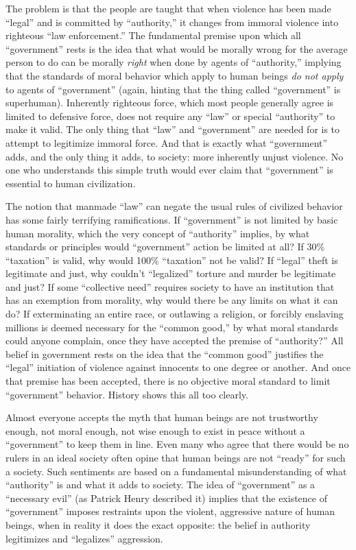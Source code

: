 \documentclass{book}
\begin{document}
The problem is that the people are taught that when violence has been made \enquote{legal} and is committed by \enquote{authority,} it changes from immoral violence into righteous \enquote{law enforcement.} The fundamental premise upon which all \enquote{government} rests is the idea that what would be morally wrong for the average person to do can be morally \emph{right} when done by agents of \enquote{authority,} implying that the standards of moral behavior which apply to human beings \emph{do not apply} to agents of \enquote{government} (again, hinting that the thing called \enquote{government} is superhuman). Inherently righteous force, which most people generally agree is limited to defensive force, does not require any \enquote{law} or special \enquote{authority} to make it valid. The only thing that \enquote{law} and \enquote{government} are needed for is to attempt to legitimize immoral force. And that is exactly what \enquote{government} adds, and the only thing it adds, to society: more inherently unjust violence. No one who understands this simple truth would ever claim that \enquote{government} is essential to human civilization.

The notion that manmade \enquote{law} can negate the usual rules of civilized behavior has some fairly terrifying ramifications. If \enquote{government} is not limited by basic human morality, which the very concept of \enquote{authority} implies, by what standards or principles would \enquote{government} action be limited at all? If 30\% \enquote{taxation} is valid, why would 100\% \enquote{taxation} not be valid? If \enquote{legal} theft is legitimate and just, why couldn't \enquote{legalized} torture and murder be legitimate and just? If some \enquote{collective need} requires society to have an institution that has an exemption from morality, why would there be any limits on what it can do? If exterminating an entire race, or outlawing a religion, or forcibly enslaving millions is deemed necessary for the \enquote{common good,} by what moral standards could anyone complain, once they have accepted the premise of \enquote{authority?} All belief in government rests on the idea that the \enquote{common good} justifies the \enquote{legal} initiation of violence against innocents to one degree or another. And once that premise has been accepted, there is no objective moral standard to limit \enquote{government} behavior. History shows this all too clearly.

Almost everyone accepts the myth that human beings are not trustworthy enough, not moral enough, not wise enough to exist in peace without a \enquote{government} to keep them in line. Even many who agree that there would be no rulers in an ideal society often opine that human beings are not \enquote{ready} for such a society. Such sentiments are based on a fundamental misunderstanding of what \enquote{authority} is and what it adds to society. The idea of \enquote{government} as a \enquote{necessary evil} (as Patrick Henry described it) implies that the existence of \enquote{government} imposes restraints upon the violent, aggressive nature of human beings, when in reality it does the exact opposite: the belief in authority legitimizes and \enquote{legalizes} aggression.
\end{document}
